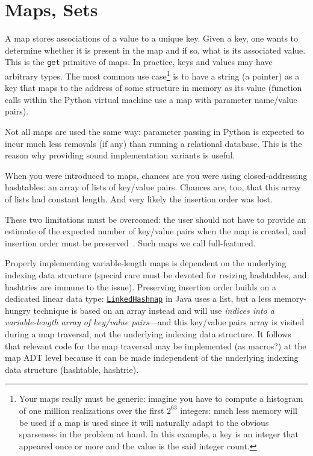 \chapter{Maps, Sets}\label{chap:maps}

A map stores associations of a value to a unique key. Given a key, one wants to determine whether it is present in the map and if so, what is its associated value. This is the \texttt{get} primitive of maps. In practice, keys and values may have arbitrary types. The most common use case\footnote{Your maps really must be generic: imagine you have to compute a histogram of one million realizations over the first $2^{63}$ integers: much less memory will be used if a map is used since it will naturally adapt to the obvious sparseness in the problem at hand. In this example, a key is an integer that appeared once or more and the value is the said integer count.} is to have a string (a pointer) as a key that maps to the address of some structure in memory as its value (function calls within the Python virtual machine use a map with parameter name/value pairs).

Not all maps are used the same way: parameter passing in Python is expected to incur much less removals (if any) than running a relational database. This is the reason why providing sound implementation variants is useful. 

When you were introduced to maps, chances are you were using closed-addressing hashtables: an array of lists of key/value pairs. Chances are, too, that this array of lists had constant length. And very likely the insertion order was lost.

These two limitations must be overcomed: the user should not have to provide an estimate of the expected number of key/value pairs when the map is created, and insertion order must be preserved~\cite{corry:maps:hate}. Such maps we call full-featured.

Properly implementing variable-length maps is dependent on the underlying indexing data structure (special care must be devoted for resizing hashtables, and hashtries are immune to the issue). Preserving insertion order builds on a dedicated linear data type: \href{https://docs.oracle.com/javase/8/docs/api/java/util/LinkedHashMap.html}{\texttt{LinkedHashmap}} in Java uses a list, but a less memory-hungry technique is based on an array instead and will use \textit{indices into a variable-length array of key/value pairs}---and this key/value pairs array is visited during a map traversal, not the underlying indexing data structure. It follows that relevant code for the map traversal may be implemented (as macros?) at the map ADT level because it can be made independent of the underlying indexing data structure (hashtable, hashtrie). 

